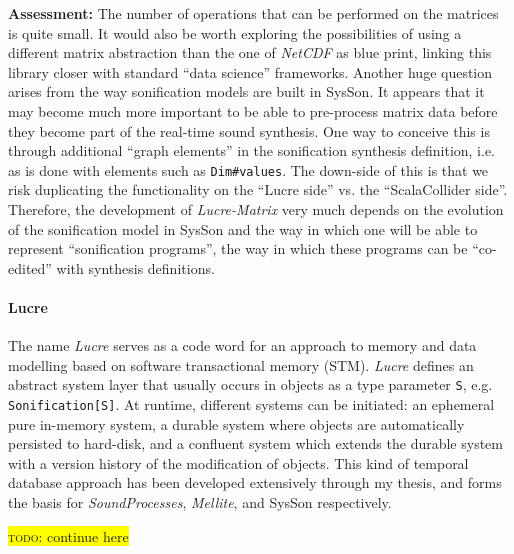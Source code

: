 \documentclass[11pt,a4paper]{article}
\newcommand{\todo}[1]{\colorbox{yellow}{\textsc{todo}: #1}}
\newcommand{\software}[1]{\textit{#1}}
\newcommand{\sysson}[0]{SysSon}
\begin{document}
\textbf{Assessment:} The number of operations that can be performed on the matrices is quite small. It would also be worth exploring the possibilities of using a different matrix abstraction than the one of \software{NetCDF} as blue print, linking this library closer with standard ``data science'' frameworks. Another huge question arises from the way sonification models are built in \sysson{}. It appears that it may become much more important to be able to pre-process matrix data before they become part of the real-time sound synthesis. One way to conceive this is through additional ``graph elements'' in the sonification synthesis definition, i.e. as is done with elements such as \verb!Dim#values!. The down-side of this is that we risk duplicating the functionality on the ``Lucre side'' vs. the ``ScalaCollider side''. Therefore, the development of \software{Lucre-Matrix} very much depends on the evolution of the sonification model in \sysson{} and the way in which one will be able to represent ``sonification programs'', the way in which these programs can be ``co-edited'' with synthesis definitions.

\paragraph{Lucre}

The name \software{Lucre} serves as a code word for an approach to memory and data modelling based on software transactional memory (STM). \software{Lucre} defines an abstract system layer that usually occurs in objects as a type parameter \verb!S!, e.g. \verb!Sonification[S]!. At runtime, different systems can be initiated: an ephemeral pure in-memory system, a durable system where objects are automatically persisted to hard-disk, and a confluent system which extends the durable system with a version history of the modification of objects. This kind of temporal database approach has been developed extensively through my thesis, and forms the basis for \software{SoundProcesses}, \software{Mellite}, and \sysson{} respectively.

\todo{continue here}
\end{document}
